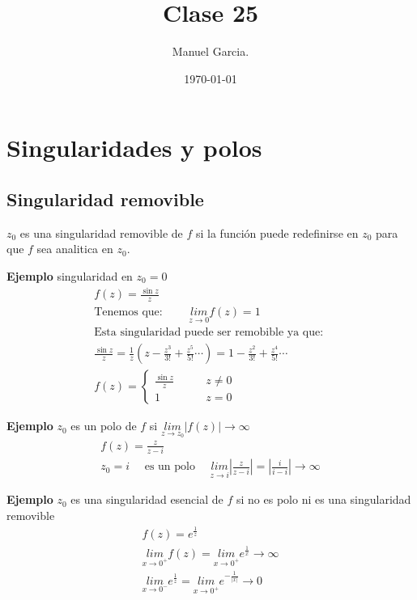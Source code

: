 \documentclass{article}
\title{Clase 25 }
\author{Manuel Garcia.}
\date{\today}
\begin{document}
\maketitle

\section{Singularidades y polos }
\subsection{Singularidad removible }
$ z_0  $ es una singularidad removible de $ f  $ si la función puede redefinirse en $ z_0  $ para que $ f  $ sea analitica en $ z_0  $. 

\textbf{Ejemplo } singularidad en $ z_0 = 0  $ 
\begin{gather*}
  f(z) = \frac{\sin{z }}{z } \\   
  \text{Tenemos que: } \qquad \underset{z  \rightarrow 0 }{lim}f(z) = 1 \\
  \text{Esta singularidad puede ser remobible ya que: }\\
  \frac{\sin{z }}{z } = \frac{1}{z } \left(z - \frac{z ^3 }{3! } + \frac{z ^5 }{5! } \cdots \right) = 1 - \frac{z^2 }{3! } + \frac{z^4 }{5! } \cdots \\
  f(z) = \begin{cases}
    \frac{\sin{z }}{z } \qquad & z \neq 0 \\
    1 \qquad & z = 0 
  \end{cases}
\end{gather*}

\textbf{Ejemplo } $ z_0  $ es un polo de $ f  $ si $ \underset{z  \rightarrow z_0 }{lim}\left|f(z) \right|\rightarrow \infty $
\begin{gather*}
  f\left(z\right)= \frac{z }{z-i }\\
  z_0 = i \quad \text{ es un polo }\quad \underset{z  \rightarrow i }{lim}\left|\frac{z }{z-i }\right| = \left|\frac{i }{i - i }\right| \rightarrow \infty
\end{gather*}

\textbf{Ejemplo } $ z_0  $ es una singularidad esencial de $ f  $ si no es polo ni es una singularidad removible 
\begin{gather*}
  f(z) = e ^ {\frac{1}{z }} \\
  \underset{x  \rightarrow 0 ^ {+ }}{lim}f(z) = \underset{x  \rightarrow 0 ^ {+}}{lim}e ^ {\frac{1}{x }} \rightarrow \infty \\
  \underset{x  \rightarrow 0 ^ {-  }}{lim}e ^ {\frac{1}{z }} = \underset{x  \rightarrow 0 ^ {+ }}{lim}e ^ {- \frac{1}{\left|x \right|}}\rightarrow 0 
\end{gather*}
\end{document}
